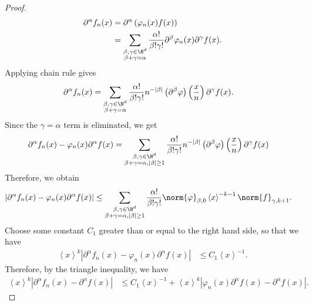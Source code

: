 \documentclass[10pt]{mypackage}
\begin{document}
\begin{proof}
  \begin{align*}
    \partial^{\alpha}f_n(x) &= \partial^{\alpha}\left( \varphi_n(x)f(x) \right)\\
                            &= \sum_{\substack{\beta,\gamma\in \N^d\\\beta + \gamma = \alpha}} \frac{\alpha!}{\beta!\gamma!} \partial^{\beta}\varphi_n(x) \partial^{\gamma}f(x).
  \end{align*}
  Applying chain rule gives
  \begin{align*}
    \partial^{\alpha}f_n(x) &= \sum_{\substack{\beta,\gamma\in \N^d\\\beta + \gamma = \alpha}} \frac{\alpha!}{\beta!\gamma!} n^{-\left\vert \beta \right\vert} \left( \partial^{\beta} \varphi \right)\left( \frac{x}{n} \right) \partial^{\gamma}f(x).
  \end{align*}
  Since the $\gamma=\alpha$ term is eliminated, we get
  \begin{align*}
    \partial^{\alpha}f_n(x) - \varphi_n(x)\partial^{\alpha}f(x)&= \sum_{\substack{\beta,\gamma\in \N^d\\\beta + \gamma = \alpha,\left\vert \beta \right\vert\geq 1}} \frac{\alpha!}{\beta!\gamma!} n^{-\left\vert \beta \right\vert} \left( \partial^{\beta} \varphi \right)\left( \frac{x}{n} \right) \partial^{\gamma}f(x)
  \end{align*}
  Therefore, we obtain
  \begin{align*}
    \left\vert \partial^{\alpha}f_n(x) - \varphi_n(x)\partial^{\alpha}f(x) \right\vert &\leq \sum_{\substack{\beta,\gamma\in \N^{d}\\\beta + \gamma = \alpha,\left\vert \beta \right\vert\geq 1}} \frac{\alpha!}{\beta!\gamma!} \norm{\varphi}_{\beta,0} \left\langle x \right\rangle^{-k-1} \norm{f}_{\gamma,k+1}.
  \end{align*}
  Choose some constant $C_1$ greater than or equal to the right hand side, so that we have
  \begin{align*}
    \left\langle x \right\rangle^{k} \left\vert \partial^{\alpha}f_n(x) - \varphi_n(x)\partial^{\alpha}f(x) \right\vert &\leq C_1 \left\langle x \right\rangle^{-1}.
  \end{align*}
  Therefore, by the triangle inequality, we have
  \begin{align*}
    \left\langle x \right\rangle^{k} \left\vert \partial^{\alpha}f_n(x) - \partial^{\alpha}f(x) \right\vert &\leq C_1\left\langle x \right\rangle^{-1} + \left\langle x \right\rangle^{k} \left\vert \varphi_n(x)\partial^{\alpha}f(x) - \partial^{\alpha}f(x) \right\vert.

\end{align*}
\end{proof}
\end{document}
